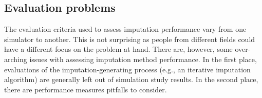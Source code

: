 \documentclass[bimj,fleqn]{w-art}
\begin{document}
% 
% 

\subsection{Evaluation problems}



The evaluation criteria used to assess imputation performance vary from one simulator to another. This is not surprising as people from different fields could have a different focus on the problem at hand. There are, however, some over-arching issues with assessing imputation method performance. In the first place, evaluations of the imputation-generating process (e.g., an iterative imputation algorithm) are generally left out of simulation study results. In the second place, there are performance measures pitfalls to consider.
\end{document}
